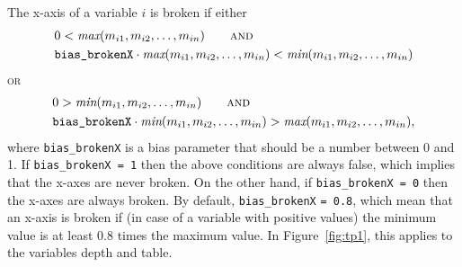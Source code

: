 \documentclass[11pt, fleqn, a4paper]{article}\usepackage{graphicx, color}
\begin{document}
The x-axis of a variable $i$ is broken if
either
\begin{align*}
& 0 < \textit{max}(m_{i1}, m_{i2},\ldots, m_{in}) \qquad \textsc{and}\\
& \mbox{{\tt bias\_brokenX}} \cdot \textit{max}(m_{i1}, m_{i2},\ldots, m_{in}) < \textit{min}(m_{i1}, m_{i2},\ldots, m_{in}) 
\end{align*}
\textsc{or}
\begin{align*}
& 0 > \textit{min}(m_{i1}, m_{i2},\ldots, m_{in}) \qquad \textsc{and}\\
& \mbox{{\tt bias\_brokenX}} \cdot \textit{min}(m_{i1}, m_{i2},\ldots, m_{in}) > \textit{max}(m_{i1}, m_{i2},\ldots, m_{in}),
\end{align*}
where {\tt bias\_brokenX} is a bias parameter that should be a number between 0 and 1. If {\tt bias\_brokenX = 1} then the above conditions are always false, which implies that the x-axes are never broken. On the other hand, if {\tt bias\_brokenX = 0} then the x-axes are always broken. By default, {\tt bias\_brokenX} {\tt= 0.8}, which mean that an x-axis is broken if (in case of a variable with positive values) the minimum value is at least 0.8 times the maximum value. In Figure~\ref{fig:tp1}, this applies to the variables depth and table.
\end{document}
